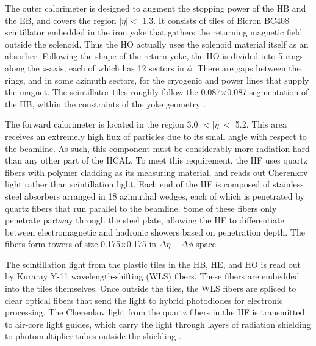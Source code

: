 The outer calorimeter is designed to augment the stopping power of the
HB and the EB, and covers the region $|\eta| <$ 1.3. It consists of
tiles of Bicron BC408 scintillator embedded in the iron yoke that
gathers the returning magnetic field outside the solenoid. Thus the HO
actually uses the solenoid material itself as an absorber.
Following the shape of the return yoke, the HO is divided into 5 rings
along the $z$-axis, each of which has 12 sectors in $\phi$. There are
gaps between the rings, and in some azimuth sectors, for the cryogenic
and power lines that supply the magnet. The scintillator tiles roughly
follow the 0.087$\times$0.087 segmentation of the HB, within the
constraints of the yoke geometry \cite{accelexper}.

The forward calorimeter is located in the region 3.0 $< |\eta| <$
5.2. This area receives an extremely high flux of particles due to its
small angle with respect to the beamline. As such, this component
must be considerably more radiation hard than any other part of the
HCAL. To meet this requirement, the HF uses quartz fibers with polymer
cladding as its measuring material, and reads out Cherenkov light rather than
scintillation light. Each end of the HF is composed of stainless steel
absorbers arranged in 18 azimuthal wedges, each of which is penetrated
by quartz fibers that run parallel to the beamline. Some of these
fibers only penetrate partway through the steel plate, allowing the HF to
differentiate between electromagnetic and hadronic showers based on
penetration depth. The fibers form towers of size 0.175$\times$0.175
in $\Delta\eta-\Delta\phi$ space \cite{accelexper}.

The scintillation light from the plastic tiles in the HB, HE, and HO is read out by
Kuraray Y-11 wavelength-shifting (WLS) fibers. These fibers are embedded
into the tiles themselves. Once outside the tiles, the WLS fibers are
spliced to clear optical fibers that send the light to hybrid
photodiodes for electronic processing. The Cherenkov light from the
quartz fibers in the HF is transmitted to air-core light guides, which carry the
light through layers of radiation shielding to photomultiplier tubes
outside the shielding \cite{accelexper}.


